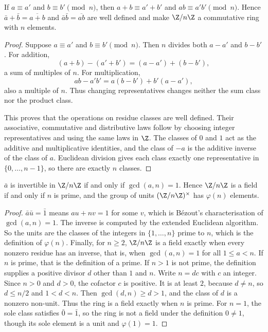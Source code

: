 \begin{proposition}\label{prop:ringZn}
If $a\equiv a'$ and $b\equiv b'\pmod n$, then $a+b\equiv a'+b'$ and $ab\equiv a'b'\pmod n$. Hence $\bar a+\bar b=\overline{a+b}$ and $\bar a\bar b=\overline{ab}$ are well defined and make $\Z/n\Z$ a commutative ring with $n$ elements.
\end{proposition}
\begin{proof}
Suppose $a\equiv a'$ and $b\equiv b'\pmod n$.
Then $n$ divides both $a-a'$ and $b-b'$.
For addition,
\[
(a+b)-(a'+b')=(a-a')+(b-b'),
\]
a sum of multiples of $n$.
For multiplication,
\[
ab-a'b'=a(b-b')+b'(a-a'),
\]
also a multiple of $n$.
Thus changing representatives changes neither
the sum class nor the product class.

This proves that the operations on residue classes
are well defined. Their associative, commutative
and distributive laws follow by choosing integer
representatives and using the same laws in $\Z$.
The classes of $0$ and $1$ act as the additive
and multiplicative identities, and the class of
$-a$ is the additive inverse of the class of $a$.
Euclidean division gives each class exactly one
representative in $\{0,\ldots,n-1\}$, so there
are exactly $n$ classes.
\end{proof}

\begin{proposition}\label{prop:units}
$\bar a$ is invertible in $\Z/n\Z$ if and only if $\gcd(a,n)=1$. Hence $\Z/n\Z$ is a field if and only if $n$ is prime, and the group of units $(\Z/n\Z)^\times$ has $\varphi(n)$ elements.
\end{proposition}
\begin{proof}
$\bar a\bar u=\bar1$ means $au+nv=1$ for some $v$, which is B\'ezout's characterisation of $\gcd(a,n)=1$. The inverse is computed by the extended Euclidean algorithm. So the units are the classes of the integers in $\{1,\dots,n\}$ prime to $n$, which is the definition of $\varphi(n)$. Finally, for $n\ge2$, $\Z/n\Z$ is a field exactly when every nonzero residue has an inverse, that is, when $\gcd(a,n)=1$ for all $1\le a<n$. If $n$ is prime, that is the definition of a prime. If $n>1$ is not prime, the definition supplies a positive divisor $d$ other than $1$ and $n$. Write $n=dc$ with $c$ an integer. Since $n>0$ and $d>0$, the cofactor $c$ is positive. It is at least $2$, because $d\ne n$, so $d\le n/2$ and $1<d<n$. Then $\gcd(d,n)\ge d>1$, and the class of $d$ is a nonzero non-unit. Thus the ring is a field exactly when $n$ is prime. For $n=1$, the sole class satisfies $\bar0=\bar1$, so the ring is not a field under the definition $0\ne1$, though its sole element is a unit and $\varphi(1)=1$.
\end{proof}

